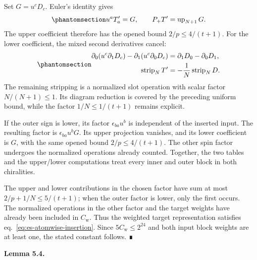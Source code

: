 \documentclass[
  english,
  11pt,
  reqno]{amsart}
\makeatletter
\newcommand{\pandocstatementheading}[1]{%
  \par\addpenalty{\@beginparpenalty}%
  \addvspace{.5\baselineskip plus .2\baselineskip minus .2\baselineskip}%
  {\normalfont\bfseries #1\par}%
  \nobreak\@afterindenttrue\@afterheading
}
\makeatother
\begin{document}
Set \(G=u^cD_c\). Euler's identity gives
\begin{equation}\protect\phantomsection\label{eq:es-upper-transfer-cancellation}{
 u^aT'_a=G,\qquad P_+T'=\operatorname{up}_{N+1}G.
}\end{equation} The upper coefficient therefore has the opened bound
\(2/p\le4/(t+1)\). For the lower coefficient, the mixed second
derivatives cancel:
\begin{equation}\protect\phantomsection\label{eq:es-lower-transfer-cancellation}{
 \begin{aligned}
 \partial_0(u^c\partial_1D_c)
       -\partial_1(u^c\partial_0D_c)
       &=\partial_1D_0-\partial_0D_1,\\
 \operatorname{strip}_NT'
       &=-\frac1N\operatorname{strip}_ND.
 \end{aligned}
}\end{equation} The remaining stripping is a normalized slot operation
with scalar factor \(N/(N+1)\le1\). Its diagram reduction is covered by
the preceding uniform bound, while the factor \(1/N\le1/(t+1)\) remains
explicit.

If the outer sign is lower, its factor \(\epsilon_{ba}u^b\) is
independent of the inserted input. The resulting factor is
\(\epsilon_{ba}u^bG\). Its upper projection vanishes, and its lower
coefficient is \(G\), with the same opened bound \(2/p\le4/(t+1)\). The
other spin factor undergoes the normalized operations already counted.
Together, the two tables and the upper/lower computations treat every
inner and outer block in both chiralities.

The upper and lower contributions in the chosen factor have sum at most
\(2/p+1/N\le5/(t+1)\); when the outer factor is lower, only the first
occurs. The normalized operations in the other factor and the target
weights have already been included in \(C_{\mathrm w}\). Thus the
weighted target representation satisfies
eq.~\ref{eq:es-atomwise-insertion}. Since \(5C_{\mathrm w}\le2^{24}\)
and both input block weights are at least one, the stated constant
follows. ∎

\pandocstatementheading{\protect{}\label{lem:es-transfer}Lemma 5.4.}
\end{document}

